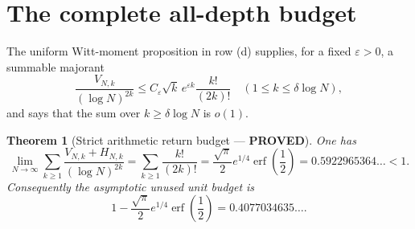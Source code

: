 \documentclass[11pt]{article}
\newcommand{\PROVED}{\textcolor{green!40!black}{\textbf{PROVED}}}
\newtheorem{theorem}{Theorem}
\begin{document}
\section{The complete all-depth budget}

The uniform Witt-moment proposition in row (d) supplies, for a fixed
$\varepsilon>0$, a summable majorant
\begin{equation}
 \frac{V_{N,k}}{(\log N)^{2k}}
 \le C_\varepsilon\sqrt k\,e^{\varepsilon k}\frac{k!}{(2k)!}
 \quad(1\le k\le\delta\log N),                                \tag{5}
\end{equation}
and says that the sum over $k\ge\delta\log N$ is $o(1)$.

\begin{theorem}[Strict arithmetic return budget --- \PROVED]
One has
\begin{equation}
 \boxed{
 \lim_{N\to\infty}
 \sum_{k\ge1}\frac{V_{N,k}+H_{N,k}}{(\log N)^{2k}}
 =\sum_{k\ge1}\frac{k!}{(2k)!}
 =\frac{\sqrt\pi}{2}e^{1/4}\operatorname{erf}\!\left(\frac12\right)
 =0.5922965364\ldots<1.}                                      \tag{6}
\end{equation}
Consequently the asymptotic unused unit budget is
\begin{equation}
 1-\frac{\sqrt\pi}{2}e^{1/4}\operatorname{erf}\!\left(\frac12\right)
 =0.4077034635\ldots.                                         \tag{7}
\end{equation}
\end{theorem}
\end{document}
